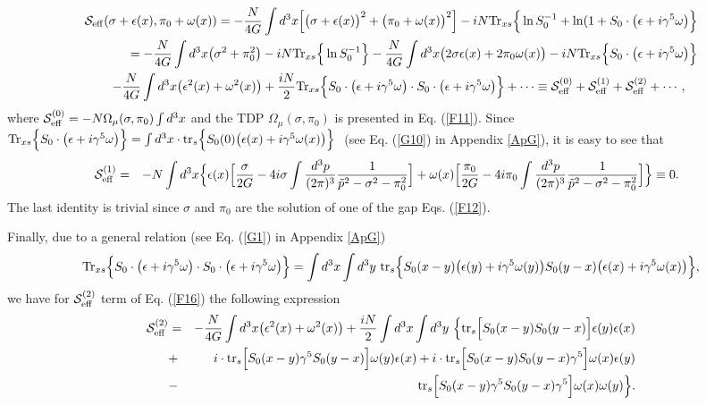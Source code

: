 \documentclass[12pt,a4paper]{article}
\begin{document}
\begin{eqnarray}
{\cal S}_{\rm {eff}}
(\sigma+\epsilon(x),\pi_0+\omega(x))=
-\frac{N}{4G}\int d^3x \Big[\big(\sigma+\epsilon(x)\big)^2+\big(\pi_0+\omega(x)\big)^2\Big]-iN {\rm Tr}_{xs}\Big\{\ln S_0^{-1}+
\ln(1+S_0\cdot \big(\epsilon+i\gamma^5\omega\big)\Big\}\nonumber\\=-\frac{N}{4G}\int d^3x \big(\sigma^2+\pi_0^2\big)-iN
{\rm Tr}_{xs}\Big\{\ln S_0^{-1}\Big\}-\frac{N}{4G}\int d^3x \big(2\sigma\epsilon(x)+2\pi_0\omega(x)\big)
-iN {\rm Tr}_{xs}\Big\{S_0\cdot \big(\epsilon+i\gamma^5\omega\big)\Big\}\nonumber\\-\frac{N}{4G}\int d^3x
\big(\epsilon^2(x)+\omega^2(x)\big)+\frac{iN}{2} {\rm Tr}_{xs}\Big\{S_0\cdot \big(\epsilon+
i\gamma^5\omega\big)\cdot S_0\cdot \big(\epsilon+i\gamma^5\omega\big)\Big\}+\cdots\equiv
{\cal S}^{(0)}_{\rm {eff}}+{\cal S}^{(1)}_{\rm {eff}}+{\cal S}^{(2)}_{\rm {eff}}+\cdots,~~~
\label{F16}
\end{eqnarray}
where ${\cal S}^{(0)}_{\rm {eff}}=-N\Omega_\mu (\sigma,\pi_0)\int d^3x$ and the TDP $\Omega_\mu
(\sigma,\pi_0)$ is presented in Eq. (\ref{F11}). Since
${\rm Tr}_{xs}\Big\{S_0\cdot \big(\epsilon+i\gamma^5\omega\big)\Big\}=\int d^3x\cdot {\rm tr}_s
\Big\{S_0(0) \big(\epsilon (x)+i\gamma^5\omega(x)\big)\Big\}~$ (see Eq. (\ref{G10}) in Appendix \ref{ApG}),
it is easy to see that
\begin{eqnarray}
{\cal S}^{(1)}_{\rm {eff}}&=&-N\int d^3x\Big\{\epsilon (x)\Big[\frac{\sigma}{2G}-4i\sigma
\int\frac{d^3p}{(2\pi)^3}\frac{1}{\tilde p^2-\sigma^2-\pi_0^2}\Big]+\omega(x)\Big[\frac{\pi_0}{2G}-4i\pi_0
\int\frac{d^3p}{(2\pi)^3}\frac{1}{\tilde p^2-\sigma^2-\pi_0^2}\Big]\Big\}\equiv 0.~~
\label{F17}
\end{eqnarray}
The last identity is trivial since $\sigma$ and $\pi_0$ are the solution of one of the gap Eqs. (\ref{F12}).

Finally, due to a general relation (see Eq. (\ref{G1}) in Appendix \ref{ApG})
$${\rm Tr}_{xs}\Big\{S_0\cdot \big(\epsilon+i\gamma^5\omega\big)\cdot S_0\cdot \big(\epsilon+i\gamma^5
\omega\big)\Big\}
=\int d^3x\int d^3y~{\rm tr}_s\Big\{S_0(x-y)\big(\epsilon(y)+i\gamma^5\omega(y)\big)
S_0(y-x)\big(\epsilon(x)+i\gamma^5\omega(x)\big)\Big\},$$ we have for ${\cal S}^{(2)}_{\rm {eff}}$ term of Eq. (\ref{F16}) the following expression
\begin{eqnarray}
{\cal S}^{(2)}_{\rm {eff}}&=&-\frac{N}{4G}\int d^3x \big(\epsilon^2(x)+\omega^2(x)\big)+\frac{iN}{2}\int d^3x\int d^3y~\Big\{{\rm tr}_s\Big[S_0(x-y)S_0(y-x)\Big]\epsilon(y)\epsilon(x)\nonumber\\&+&
i\cdot {\rm tr}_s\Big[S_0(x-y)\gamma^5S_0(y-x)\Big]\omega(y)\epsilon(x)+i\cdot {\rm tr}_s\Big[S_0(x-y)S_0(y-x)\gamma^5\Big]\omega(x)\epsilon(y)\nonumber\\&-&{\rm tr}_s\Big[S_0(x-y)\gamma^5S_0(y-x)\gamma^5\Big]\omega(x)\omega(y)\Big\}.
\label{F18}
\end{eqnarray}
\end{document}
